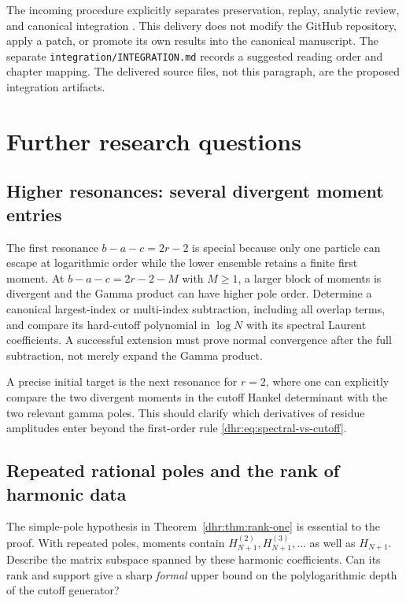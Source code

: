 \documentclass[11pt,letterpaper]{article}
\numberwithin{equation}{section}
\theoremstyle{definition}\newtheorem{definition}[theorem]{Definition}
\theoremstyle{remark}\newtheorem{remark}[theorem]{Remark}
\begin{document}
The incoming procedure explicitly separates preservation, replay,
analytic review, and canonical integration \cite{repo:intake}. This
delivery does not modify the GitHub repository, apply a patch, or
promote its own results into the canonical manuscript. The separate
\texttt{integration/INTEGRATION.md} records a suggested reading order
and chapter mapping. The delivered source files, not this paragraph,
are the proposed integration artifacts.


\section{Further research questions}
\label{dhr:sec:research}

\subsection{Higher resonances: several divergent moment entries}
The first resonance $b-a-c=2r-2$ is special because only one particle
can escape at logarithmic order while the lower ensemble retains a
finite first moment. At $b-a-c=2r-2-M$ with $M\geq1$, a larger
block of moments is divergent and the Gamma product can have higher
pole order. Determine a canonical largest-index or multi-index
subtraction, including all overlap terms, and compare its hard-cutoff
polynomial in $\log N$ with its spectral Laurent coefficients.
A successful extension must prove normal convergence after the full
subtraction, not merely expand the Gamma product.

A precise initial target is the next resonance for $r=2$, where one
can explicitly compare the two divergent moments in the cutoff
Hankel determinant with the two relevant gamma poles. This should
clarify which derivatives of residue amplitudes enter beyond the
first-order rule \eqref{dhr:eq:spectral-vs-cutoff}.

\subsection{Repeated rational poles and the rank of harmonic data}
The simple-pole hypothesis in Theorem~\ref{dhr:thm:rank-one} is
essential to the proof. With repeated poles, moments contain
$H_{N+1}^{(2)},H_{N+1}^{(3)},\ldots$ as well as $H_{N+1}$.
Describe the matrix subspace spanned by these harmonic coefficients.
Can its rank and support give a sharp \emph{formal} upper bound on
the polylogarithmic depth of the cutoff generator?
\end{document}

